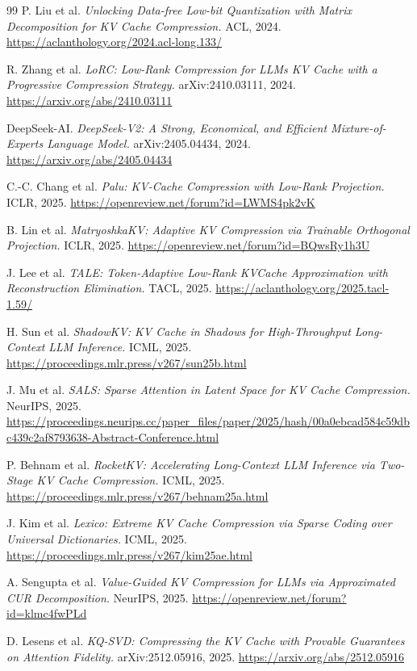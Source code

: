 \documentclass[10pt]{article}
\begin{document}
\begin{thebibliography}{99}
 P. Liu et al. \emph{Unlocking Data-free Low-bit Quantization with Matrix
Decomposition for KV Cache Compression.} ACL, 2024.
\url{https://aclanthology.org/2024.acl-long.133/}

 R. Zhang et al. \emph{LoRC: Low-Rank Compression for LLMs KV Cache with a
Progressive Compression Strategy.} arXiv:2410.03111, 2024.
\url{https://arxiv.org/abs/2410.03111}

 DeepSeek-AI. \emph{DeepSeek-V2: A Strong, Economical, and Efficient
Mixture-of-Experts Language Model.} arXiv:2405.04434, 2024.
\url{https://arxiv.org/abs/2405.04434}

 C.-C. Chang et al. \emph{Palu: KV-Cache Compression with Low-Rank Projection.}
ICLR, 2025. \url{https://openreview.net/forum?id=LWMS4pk2vK}

 B. Lin et al. \emph{MatryoshkaKV: Adaptive KV Compression via Trainable
Orthogonal Projection.} ICLR, 2025. \url{https://openreview.net/forum?id=BQwsRy1h3U}

 J. Lee et al. \emph{TALE: Token-Adaptive Low-Rank KVCache Approximation with
Reconstruction Elimination.} TACL, 2025. \url{https://aclanthology.org/2025.tacl-1.59/}

 H. Sun et al. \emph{ShadowKV: KV Cache in Shadows for High-Throughput
Long-Context LLM Inference.} ICML, 2025.
\url{https://proceedings.mlr.press/v267/sun25b.html}

 J. Mu et al. \emph{SALS: Sparse Attention in Latent Space for KV Cache
Compression.} NeurIPS, 2025.
\url{https://proceedings.neurips.cc/paper_files/paper/2025/hash/00a0ebcad584c59dbc439c2af8793638-Abstract-Conference.html}

 P. Behnam et al. \emph{RocketKV: Accelerating Long-Context LLM Inference via
Two-Stage KV Cache Compression.} ICML, 2025.
\url{https://proceedings.mlr.press/v267/behnam25a.html}

 J. Kim et al. \emph{Lexico: Extreme KV Cache Compression via Sparse Coding over
Universal Dictionaries.} ICML, 2025. \url{https://proceedings.mlr.press/v267/kim25ae.html}

 A. Sengupta et al. \emph{Value-Guided KV Compression for LLMs via Approximated
CUR Decomposition.} NeurIPS, 2025. \url{https://openreview.net/forum?id=klmc4fwPLd}

 D. Lesens et al. \emph{KQ-SVD: Compressing the KV Cache with Provable Guarantees
on Attention Fidelity.} arXiv:2512.05916, 2025. \url{https://arxiv.org/abs/2512.05916}


\end{thebibliography}
\end{document}
